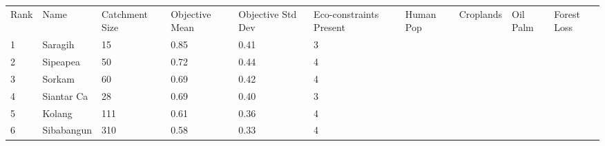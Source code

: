\begin{table}[ht]
\centering
\begingroup\fontsize{8pt}{9pt}\selectfont
\begin{tabular}{C{0.03\textwidth}C{0.12\textwidth}C{0.09\textwidth}C{0.08\textwidth}C{0.08\textwidth}C{0.08\textwidth}C{0.07\textwidth}C{0.07\textwidth}C{0.07\textwidth}C{0.07\textwidth}}
 Rank & Name & Catchment Size & Objective Mean & Objective Std Dev & Eco-constraints  Present & Human Pop & Croplands & Oil Palm & Forest Loss \\ 
 {1} & Saragih &  15 & \textcolor[HTML]{FFFFFF}{0.85} & \textcolor[HTML]{FFFFFF}{0.41} & \textcolor[HTML]{000000}{3} &  &  &  &  \\ 
  {2} & Sipeapea &  50 & \textcolor[HTML]{FFFFFF}{0.72} & \textcolor[HTML]{FFFFFF}{0.44} & \textcolor[HTML]{FFFFFF}{4} &  &  &  &  \\ 
  {3} & Sorkam &  60 & \textcolor[HTML]{FFFFFF}{0.69} & \textcolor[HTML]{FFFFFF}{0.42} & \textcolor[HTML]{FFFFFF}{4} &  &  &  &  \\ 
  {4} & Siantar Ca &  28 & \textcolor[HTML]{000000}{0.69} & \textcolor[HTML]{FFFFFF}{0.40} & \textcolor[HTML]{000000}{3} &  &  &  &  \\ 
  {5} & Kolang & 111 & \textcolor[HTML]{000000}{0.61} & \textcolor[HTML]{000000}{0.36} & \textcolor[HTML]{FFFFFF}{4} &  &  &  &  \\ 
  {6} & Sibabangun & 310 & \textcolor[HTML]{000000}{0.58} & \textcolor[HTML]{000000}{0.33} & \textcolor[HTML]{FFFFFF}{4} &  &  &  &  \\ 

\end{tabular}
\end{table}
